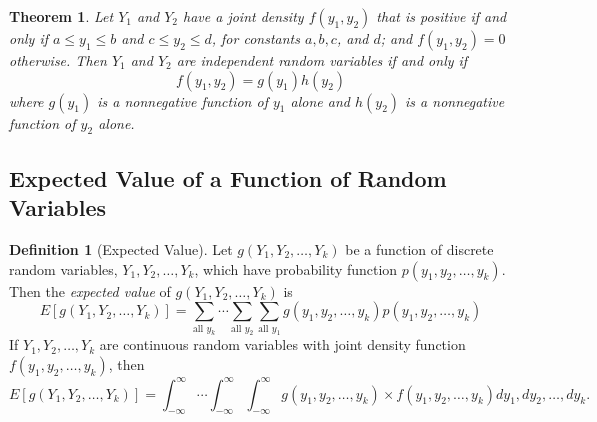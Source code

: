\documentclass{article}
\theoremstyle{plain}
\newtheorem{thm}{Theorem}[section]
\theoremstyle{definition}
\newtheorem{defn}{Definition}[section]
\theoremstyle{remark}
\begin{document}
\begin{thm}
Let $Y_1$ and $Y_2$ have a joint density $f(y_1, y_2)$ that is positive if and only if $a \leq y_1 \leq b$ and $c \leq y_2 \leq d$, for constants $a,b,c$, and $d$; and $f(y_1, y_2) = 0$ otherwise. Then $Y_1$ and $Y_2$ are independent random variables if and only if
$$
f(y_1,y_2) = g(y_1)h(y_2)
$$
where $g(y_1)$ is a nonnegative function of $y_1$ alone and $h(y_2)$ is a nonnegative function of $y_2$ alone.
\end{thm}

\subsection{Expected Value of a Function of Random Variables}
\begin{defn}[Expected Value]
Let $g(Y_1, Y_2, \ldots, Y_k)$ be a function of discrete random variables, $Y_1,Y_2,\ldots, Y_k$, which have probability function $p(y_1, y_2, \ldots, y_k)$. Then the \textit{expected value} of $g(Y_1, Y_2,\ldots, Y_k)$ is
$$
E[g(Y_1,Y_2,\ldots,Y_k)] = \displaystyle \sum_{\text{all } y_k} \cdots \sum_{\text{all } y_2} \sum_{\text{all } y_1} g(y_1,y_2,\ldots,y_k) p(y_1,y_2,\ldots,y_k)
$$
If $Y_1, Y_2, \ldots, Y_k$ are continuous random variables with joint density function $f(y_1, y_2, \ldots, y_k)$, then
$$
E[g(Y_1,Y_2,\ldots,Y_k)] = \displaystyle \int_{-\infty}^{\infty} \cdots \int_{-\infty}^{\infty} \int_{-\infty}^{\infty} g(y_1,y_2,\ldots,y_k)\times f(y_1,y_2,\ldots,y_k) dy_1, dy_2, \ldots, dy_k.
$$
\end{defn}
\end{document}
